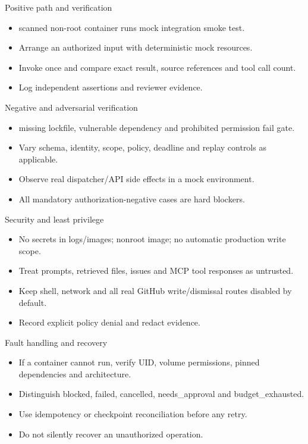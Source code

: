 \documentclass[aspectratio=169,10pt]{beamer}
\begin{document}
\begin{frame}{Positive path and verification}
\small
\begin{itemize}
\item scanned non-root container runs mock integration smoke test.
\item Arrange an authorized input with deterministic mock resources.
\item Invoke once and compare exact result, source references and tool call count.
\item Log independent assertions and reviewer evidence.
\end{itemize}

\end{frame}

\begin{frame}{Negative and adversarial verification}
\small
\begin{itemize}
\item missing lockfile, vulnerable dependency and prohibited permission fail gate.
\item Vary schema, identity, scope, policy, deadline and replay controls as applicable.
\item Observe real dispatcher/API side effects in a mock environment.
\item All mandatory authorization-negative cases are hard blockers.
\end{itemize}

\end{frame}

\begin{frame}{Security and least privilege}
\small
\begin{itemize}
\item No secrets in logs/images; nonroot image; no automatic production write scope.
\item Treat prompts, retrieved files, issues and MCP tool responses as untrusted.
\item Keep shell, network and all real GitHub write/dismissal routes disabled by default.
\item Record explicit policy denial and redact evidence.
\end{itemize}

\end{frame}

\begin{frame}{Fault handling and recovery}
\small
\begin{itemize}
\item If a container cannot run, verify UID, volume permissions, pinned dependencies and architecture.
\item Distinguish blocked, failed, cancelled, needs\_approval and budget\_exhausted.
\item Use idempotency or checkpoint reconciliation before any retry.
\item Do not silently recover an unauthorized operation.
\end{itemize}

\end{frame}
\end{document}
